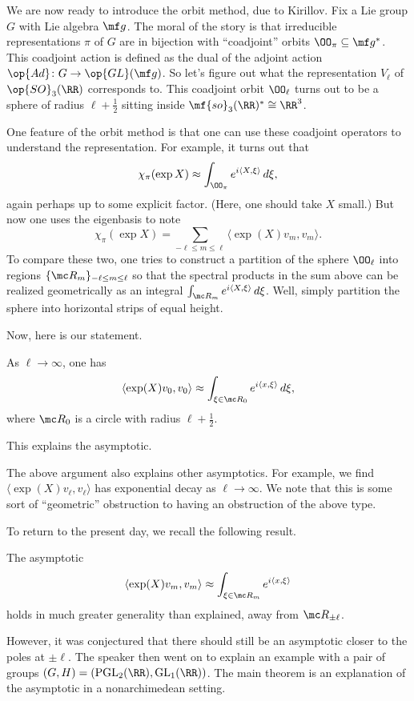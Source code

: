 \documentclass{article}
\begin{document}
We are now ready to introduce the orbit method, due to Kirillov. Fix a Lie group $G$ with Lie algebra $\mf g$. The moral of the story is that irreducible representations $\pi$ of $G$ are in bijection with ``coadjoint'' orbits $\OO_\pi\subseteq\mf g^*$. This coadjoint action is defined as the dual of the adjoint action $\op{Ad}\colon G\to\op{GL}(\mf g)$. So let's figure out what the representation $V_\ell$ of $\op{SO}_3(\RR)$ corresponds to. This coadjoint orbit $\OO_\ell$ turns out to be a sphere of radius $\ell+\frac12$ sitting inside $\mf{so}_3(\RR)^*\cong\RR^3$.

One feature of the orbit method is that one can use these coadjoint operators to understand the representation. For example, it turns out that
\[\chi_\pi(\exp X)\approx\int_{\OO_\pi}e^{i\langle X,\xi\rangle}\,d\xi,\]
again perhaps up to some explicit factor. (Here, one should take $X$ small.) But now one uses the eigenbasis to note
\[\chi_\pi(\exp X)=\sum_{-\ell\le m\le \ell}\langle\exp(X)v_m,v_m\rangle.\]
To compare these two, one tries to construct a partition of the sphere $\OO_\ell$ into regions $\{\mc R_m\}_{-\ell\le m\le\ell}$ so that the spectral products in the sum above can be realized geometrically as an integral $\int_{\mc R_m}e^{i\langle X,\xi\rangle}\,d\xi$. Well, simply partition the sphere into horizontal strips of equal height.

Now, here is our statement.
\begin{theorem}
	As $\ell\to\infty$, one has
	\[\langle\exp(X)v_0,v_0\rangle\approx\int_{\xi\in\mc R_0}e^{i\langle x,\xi\rangle}\,d\xi,\]
	where $\mc R_0$ is a circle with radius $\ell+\frac12$.
\end{theorem}
This explains the asymptotic.
\begin{remark}
	The above argument also explains other asymptotics. For example, we find $\langle\exp(X)v_\ell,v_\ell\rangle$ has exponential decay as $\ell\to\infty$. We note that this is some sort of ``geometric'' obstruction to having an obstruction of the above type.
\end{remark}
To return to the present day, we recall the following result.
\begin{theorem}
	The asymptotic
	\[\langle\exp(X)v_m,v_m\rangle\approx\int_{\xi\in\mc R_m}e^{i\langle x,\xi\rangle}\]
	holds in much greater generality than explained, away from $\mc R_{\pm\ell}$.
\end{theorem}
However, it was conjectured that there should still be an asymptotic closer to the poles at $\pm\ell$. The speaker then went on to explain an example with a pair of groups $(G,H)=(\mathrm{PGL}_2(\RR),\mathrm{GL}_1(\RR))$. The main theorem is an explanation of the asymptotic in a nonarchimedean setting.
\end{document}
